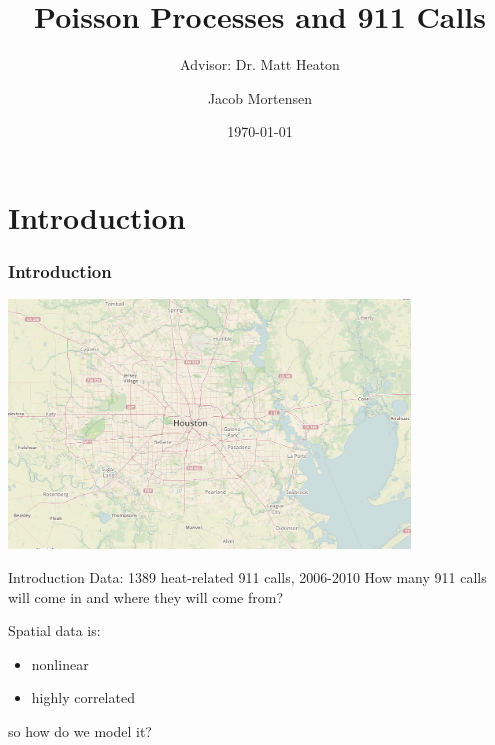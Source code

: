 \documentclass[10pt, compress]{beamer}
\title{Poisson Processes and 911 Calls}
\subtitle{Advisor: Dr. Matt Heaton}
\date{\today}
\author{Jacob Mortensen}
\institute{Brigham Young University}
\begin{document}
  \maketitle
  
  \section{Introduction}
  \begin{frame}
    \frametitle{Introduction}
    \centering
    \includegraphics[width=0.8\textwidth]{houston_map.jpg}
  \end{frame}
  \begin{frame}{Introduction}
    Data: 1389 heat-related 911 calls, 2006-2010 \newline
    \newline
    How many 911 calls will come in and where they will come from? \newline

    \centering
    \begin{minipage}{0.8\textwidth}
      Spatial data is:
      \begin{itemize}
        \item nonlinear
        \item highly correlated
      \end{itemize}
    so how do we model it?
    \end{minipage}
  \end{frame}
\end{document}
